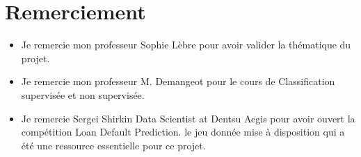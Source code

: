 {\vspace*{8cm}\large
\section*{Remerciement}
\begin{itemize}
\item Je remercie mon professeur Sophie Lèbre pour avoir valider la thématique du projet.
\item Je remercie mon professeur M. Demangeot pour le cours de Classification supervisée et non supervisée.
\item Je remercie Sergei Shirkin Data Scientist at Dentsu Aegis pour avoir ouvert la compétition Loan Default Prediction. le jeu donnée mise à disposition qui a été une ressource essentielle pour ce projet. 
\end{itemize}
}
\newpage